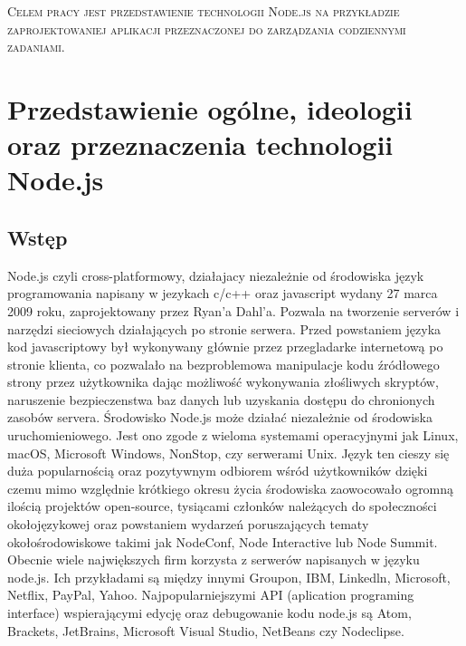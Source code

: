 \documentclass[12pt]{report}
\begin{document}
\begin{titlepage}
	\centering
	{\scshape\LARGE Celem pracy jest przedstawienie technologii Node.js na przykładzie zaprojektowaniej aplikacji przeznaczonej do zarządzania codziennymi zadaniami.  \par}
\end{titlepage}
\tableofcontents

\chapter{Przedstawienie ogólne, ideologii oraz przeznaczenia technologii Node.js} \label{rozdz.1}

\section{Wstęp}
Node.js czyli cross-platformowy, działajacy niezależnie od środowiska język programowania napisany w jezykach c/c++ oraz javascript wydany 27 marca 2009 roku, zaprojektowany przez Ryan’a Dahl’a. 
Pozwala na tworzenie serverów i narzędzi sieciowych działających po stronie serwera. 
Przed powstaniem języka kod javascriptowy był wykonywany głównie przez przegladarke internetową po stronie klienta, co pozwalało na bezproblemowa manipulacje kodu źródłowego strony przez użytkownika dając możliwość wykonywania złośliwych skryptów, naruszenie bezpieczenstwa baz danych lub uzyskania dostępu do chronionych zasobów servera. 
Środowisko Node.js może działać niezależnie od środowiska uruchomieniowego. 
Jest ono zgode z wieloma systemami operacyjnymi jak  Linux, macOS, Microsoft Windows, NonStop, czy serwerami Unix. 
Język ten cieszy się duża popularnością oraz pozytywnym odbiorem wśród użytkowników dzięki czemu mimo względnie krótkiego okresu życia środowiska zaowocowało ogromną ilością projektów open-source, tysiącami członków należących do społeczności okołojęzykowej oraz powstaniem wydarzeń poruszających tematy okołośrodowiskowe takimi jak NodeConf, Node Interactive lub Node Summit. 
Obecnie wiele największych firm korzysta z serwerów napisanych w języku node.js. 
Ich przykładami są między innymi Groupon, IBM, Linkedln, Microsoft, Netflix, PayPal, Yahoo. 
Najpopularniejszymi API (aplication programing interface) wspierającymi edycję oraz debugowanie kodu node.js są Atom, Brackets, JetBrains, Microsoft Visual Studio, NetBeans czy Nodeclipse.
\end{document}
